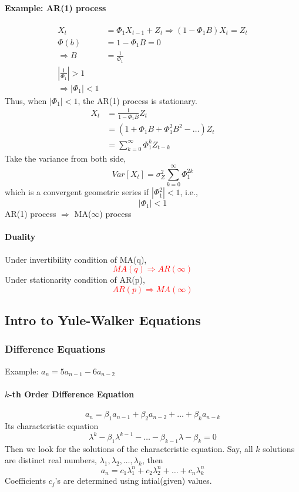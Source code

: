 \documentclass[11pt]{article}
\begin{document}
\paragraph{Example: AR(1) process}
\begin{align*}
	X_t &= \Phi_1 X_{t-1} + Z_t \Rightarrow (1 - \Phi_1 B) X_t = Z_t \\
	\Phi(b) &= 1 - \Phi_1 B  = 0 \\
	\Rightarrow B &= \frac{1}{\Phi_1} \\
	|\frac{1}{\Phi_1}| > 1 \\
	\Rightarrow |\Phi_1| < 1 
\end{align*}
Thus, when $|\Phi_1| < 1$, the AR(1) process is stationary.
\begin{align*}
	X_t &= \frac{1}{1 - \Phi_1 B} Z_t \\
	&= (1 + \Phi_1 B + \Phi_1^2 B^2 - \hdots) Z_t \\
	&= \sum_{k=0}^\infty \Phi_1^k Z_{t-k} 
\end{align*}
Take the variance from both side,
$$Var[X_t] = \sigma_Z^2 \sum_{k=0}^{\infty} \Phi_1^{2k}$$
which is a convergent geometric series if $|\Phi_1^2| < 1$, i.e.,
$$|\Phi_1| < 1$$
AR(1) process $\Rightarrow$ MA($\infty$) process
\paragraph{Duality}
Under invertibility condition of MA(q),
\textcolor{red}{$$MA(q) \Rightarrow AR(\infty)$$}
Under stationarity condition of AR(p),
\textcolor{red}{$$AR(p) \Rightarrow MA(\infty)$$}

\subsection{Intro to Yule-Walker Equations}
\subsubsection{Difference Equations}
Example: $a_n = 5a_{n-1} - 6a_{n-2}$

\paragraph{$k$-th Order Difference Equation}
$$a_n = \beta_1a_{n-1} + \beta_2 a_{n-2} + \hdots + \beta_k a_{n-k}$$
Its characteristic equation
$$\lambda^k - \beta_1\lambda^{k-1} - \hdots - \beta_{k-1}\lambda - \beta_k = 0$$
Then we look for the solutions of the characteristic equation. Say, all $k$ solutions are distinct real numbers, $\lambda_1, \lambda_2, \hdots, \lambda_k$, then
$$a_n = c_1\lambda_1^n + c_2\lambda_2^n + \hdots + c_n\lambda_k^n$$
Coefficients $c_j$'s are determined using intial(given) values.
\end{document}
